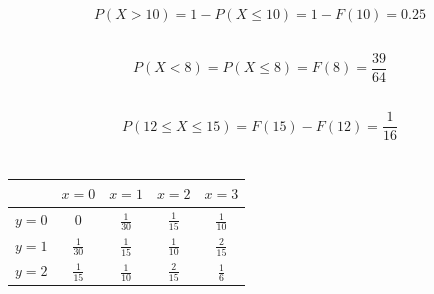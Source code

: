 \documentclass{article}
\begin{document}
        \subsection{}
            \paragraph{
                $$P(X> 10)=1-P(X\leq 10)=1-F(10)=0.25$$
            }   
        \subsection{}
            \paragraph{
                $$P(X < 8)=P(X \leq 8)=F(8)=\frac{39}{64}$$
            }
        \subsection{}
            \paragraph{
                $$P(12\leq X \leq 15)=F(15)-F(12)=\frac{1}{16}$$
            }
    \section{}
        \subsection{}
        \begin{tabular}{|c|c|c|c|c|}
            \hline        & $x=0$ & $x=1$ & $x=2$ & $x=3$ \\
            \hline  $y=0$ & $0$ & $\frac{1}{30}$ & $\frac{1}{15}$ & $\frac{1}{10}$ \\
            \hline  $y=1$ & $\frac{1}{30}$ & $\frac{1}{15}$ & $\frac{1}{10}$ & $\frac{2}{15}$ \\
            \hline  $y=2$ & $\frac{1}{15}$ & $\frac{1}{10}$ & $\frac{2}{15}$ & $\frac{1}{6}$ \\
            \hline
        \end{tabular}
        \subsection{}
\end{document}
